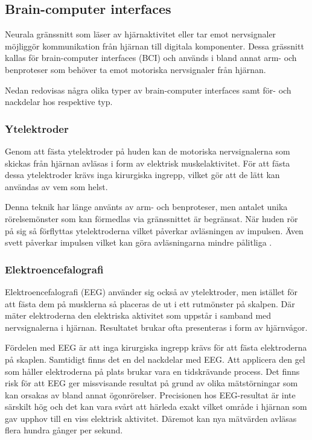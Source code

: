\documentclass[12pt, a4paper]{article}
\begin{document}

\subsection{Brain-computer interfaces}

Neurala gränssnitt som läser av hjärnaktivitet eller tar emot nervsignaler möjliggör kommunikation från hjärnan till digitala komponenter. Dessa grässnitt kallas för brain-computer interfaces (BCI) och används i bland annat arm- och benproteser som behöver ta emot motoriska nervsignaler från hjärnan.

Nedan redovisas några olika typer av brain-computer interfaces samt för- och nackdelar hos respektive typ.


\subsubsection{Ytelektroder}

Genom att fästa ytelektroder på huden kan de motoriska nervsignalerna som skickas från hjärnan avläsas i form av elektrisk muskelaktivitet. För att fästa dessa ytelektroder krävs inga kirurgiska ingrepp, vilket gör att de lätt kan användas av vem som helst.

Denna teknik har länge använts av arm- och benproteser, men antalet unika rörelsemönster som kan förmedlas via gränssnittet är begränsat. När huden rör på sig så förflyttas ytelektroderna vilket påverkar avläsningen av impulsen. Även svett påverkar impulsen vilket kan göra avläsningarna mindre pålitliga \cite{prosthetic_operation}.


\subsubsection{Elektroencefalografi}

Elektroencefalografi (EEG) använder sig också av ytelektroder, men istället för att fästa dem på musklerna så placeras de ut i ett rutmönster på skalpen. Där mäter elektroderna den elektriska aktivitet som uppstår i samband med nervsignalerna i hjärnan. Resultatet brukar ofta presenteras i form av hjärnvågor.

Fördelen med EEG är att inga kirurgiska ingrepp krävs för att fästa elektroderna på skaplen. Samtidigt finns det en del nackdelar med EEG. Att applicera den gel som håller elektroderna på plats brukar vara en tidskrävande process. Det finns risk för att EEG ger missvisande resultat på grund av olika mätstörningar som kan orsakas av bland annat ögonrörelser. Precisionen hos EEG-resultat är inte särskilt hög och det kan vara svårt att härleda exakt vilket område i hjärnan som gav upphov till en viss elektrisk aktivitet. Däremot kan nya mätvärden avläsas flera hundra gånger per sekund.
\end{document}
